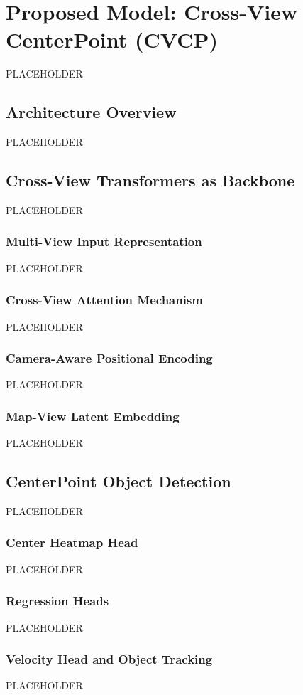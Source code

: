 \documentclass[twocolumn, times]{article}
\begin{document}
\section{Proposed Model: Cross-View CenterPoint (CVCP)}
PLACEHOLDER

\subsection{Architecture Overview}
PLACEHOLDER

\subsection{Cross-View Transformers as Backbone}
PLACEHOLDER

\subsubsection{Multi-View Input Representation}
PLACEHOLDER

\subsubsection{Cross-View Attention Mechanism}
PLACEHOLDER

\subsubsection{Camera-Aware Positional Encoding}
PLACEHOLDER

\subsubsection{Map-View Latent Embedding}
PLACEHOLDER

\subsection{CenterPoint Object Detection}
PLACEHOLDER

\subsubsection{Center Heatmap Head}
PLACEHOLDER

\subsubsection{Regression Heads}
PLACEHOLDER

\subsubsection{Velocity Head and Object Tracking}
PLACEHOLDER
\end{document}
